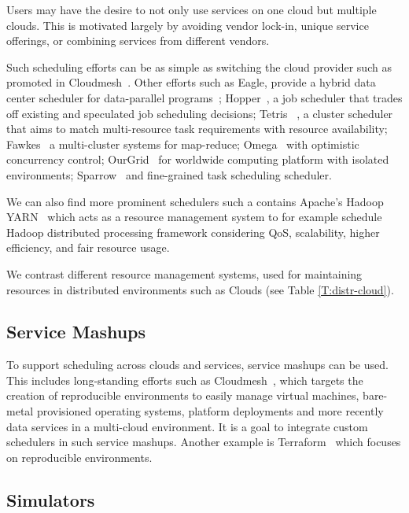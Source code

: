 \documentclass[final,5p,times,twocolumn]{elsarticle}
\begin{document}
Users may have the desire to not only use services on one cloud but multiple clouds. This is motivated largely by avoiding vendor lock-in, unique service offerings, or combining services from different vendors.

Such scheduling efforts can be as simple as switching the cloud provider such as promoted in Cloudmesh~\cite{von2014accessing}. Other efforts such as Eagle, provide a hybrid data center scheduler for data-parallel programs~\cite{delgado2016job}; Hopper~\cite{ren2015hopper}, a job scheduler that trades off existing and speculated job scheduling decisions; Tetris ~\cite{grandl2015multi}, a cluster scheduler that aims to match multi-resource task requirements with resource availability; Fawkes~\cite{ghit2014balanced} a multi-cluster systems for map-reduce; Omega~\cite{schwarzkopf2013omega} with optimistic concurrency control; OurGrid~\cite{andrade2003ourgrid,cirne2006labs} for worldwide computing platform with isolated environments; Sparrow~\cite{ousterhout2013sparrow} and fine-grained task scheduling scheduler.
 
We can also find more prominent schedulers such a contains Apache's Hadoop YARN~\cite{vavilapalli2013apache} which acts as a resource management system to for example schedule Hadoop distributed processing framework considering QoS, scalability, higher efficiency, and fair resource usage.

We contrast different resource management systems, used for maintaining resources in distributed environments such as Clouds (see Table \ref{T:distr-cloud}).

%


\subsection{Service Mashups} 
\label{sec:mesh}

To support scheduling across clouds and services, service mashups can be used. This includes long-standing efforts such as Cloudmesh~\cite{von2014accessing}, which targets the creation of reproducible environments to easily manage virtual machines, bare-metal provisioned operating systems, platform deployments and more recently data services in a multi-cloud environment. It is a goal to integrate custom schedulers in such service mashups. Another example is Terraform~\cite{www-terraform} which focuses on reproducible environments.

\subsection{Simulators}
\label{sec:simulators}
\end{document}
